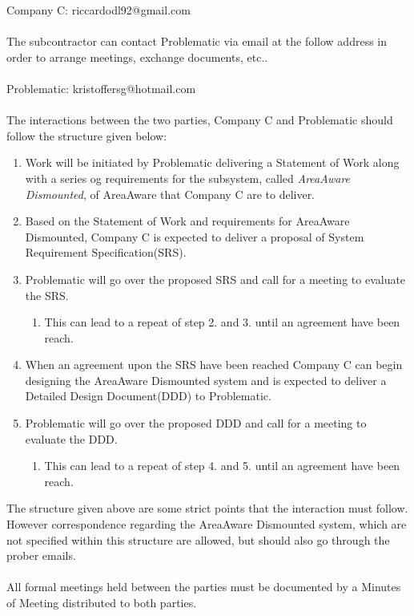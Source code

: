 Company C: riccardodl92@gmail.com\\\\

\noindent The subcontractor can contact Problematic via email at the follow address in order to arrange meetings, exchange documents, etc..\\\\

Problematic: kristoffersg@hotmail.com\\\\

\noindent The interactions between the two parties, Company C and Problematic should follow the structure given below:
\begin{enumerate}
    \item Work will be initiated by Problematic delivering a Statement of Work along with a series og requirements for the subsystem, called \emph{AreaAware Dismounted}, of AreaAware that Company C are to deliver.
    \item Based on the Statement of Work and requirements for AreaAware Dismounted, Company C is expected to deliver a proposal of System Requirement Specification(SRS).
    \item Problematic will go over the proposed SRS and call for a meeting to evaluate the SRS.
    \begin{enumerate}
        \item This can lead to a repeat of step 2. and 3. until an agreement have been reach.
    \end{enumerate}
    \item When an agreement upon the SRS have been reached Company C can begin designing the AreaAware Dismounted system and is expected to deliver a Detailed Design Document(DDD) to Problematic.
    \item Problematic will go over the proposed DDD and call for a meeting to evaluate the DDD.
    \begin{enumerate}
        \item This can lead to a repeat of step 4. and 5. until an agreement have been reach.
    \end{enumerate}
\end{enumerate}
The structure given above are some strict points that the interaction must follow.
However correspondence regarding the AreaAware Dismounted system, which are not specified within this structure are allowed, but should also go through the prober emails.\\\\
All formal meetings held between the parties must be documented by a Minutes of Meeting distributed to both parties.


